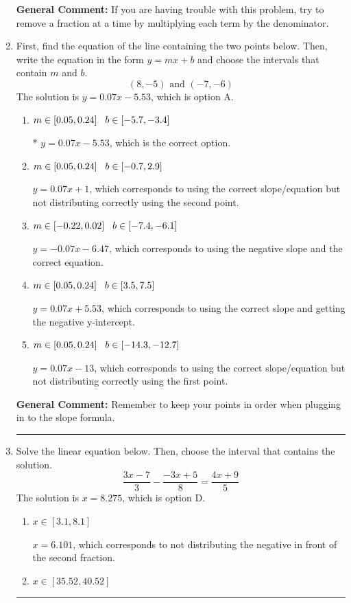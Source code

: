 \documentclass{extbook}[14pt]
\newcommand{\litem}[1]{\item #1

\rule{\textwidth}{0.4pt}}
\begin{document}
\begin{enumerate}
{\textbf{General Comment:} If you are having trouble with this problem, try to remove a fraction at a time by multiplying each term by the denominator.
}
\litem{
First, find the equation of the line containing the two points below. Then, write the equation in the form $ y=mx+b $ and choose the intervals that contain $m$ and $b$.
\[ (8, -5) \text{ and } (-7, -6) \]The solution is \( y = 0.07x -5.53 \), which is option A.\begin{enumerate}[label=\Alph*.]
\item \( m \in [0.05, 0.24] \hspace*{3mm} b \in [-5.7, -3.4] \)

* $y = 0.07x -5.53$, which is the correct option.
\item \( m \in [0.05, 0.24] \hspace*{3mm} b \in [-0.7, 2.9] \)

 $y = 0.07x + 1$, which corresponds to using the correct slope/equation but not distributing correctly using the second point.
\item \( m \in [-0.22, 0.02] \hspace*{3mm} b \in [-7.4, -6.1] \)

 $y = -0.07x -6.47$, which corresponds to using the negative slope and the correct equation.
\item \( m \in [0.05, 0.24] \hspace*{3mm} b \in [3.5, 7.5] \)

 $y = 0.07x + 5.53$, which corresponds to using the correct slope and getting the negative y-intercept.
\item \( m \in [0.05, 0.24] \hspace*{3mm} b \in [-14.3, -12.7] \)

 $y = 0.07x -13$, which corresponds to using the correct slope/equation but not distributing correctly using the first point.
\end{enumerate}

\textbf{General Comment:} Remember to keep your points in order when plugging in to the slope formula.
}
\litem{
Solve the linear equation below. Then, choose the interval that contains the solution.
\[ \frac{3x -7}{3} - \frac{-3x + 5}{8} = \frac{4x + 9}{5} \]The solution is \( x = 8.275 \), which is option D.\begin{enumerate}[label=\Alph*.]
\item \( x \in [3.1, 8.1] \)

 $x = 6.101$, which corresponds to not distributing the negative in front of the second fraction.
\item \( x \in [35.52, 40.52] \)


\end{enumerate}}
\end{enumerate}
\end{document}
